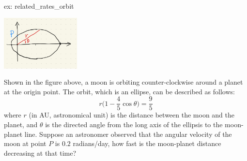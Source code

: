 \begin{ex}[]{ex: related_rates_orbit}
    \begin{center}
        \includegraphics[width = 0.3\textwidth]{figures/chap 05/rel_rates_orbit.png}
        \label{fig: rel_rates_orbit}    
    \end{center}
    Shown in the figure above, a moon is orbiting counter-clockwise around a planet at the origin point.  The orbit, which is an ellipse, can be described as follows:
    \[r\Big(1-\frac{4}{5}\cos \theta \Big) = \frac{9}{5}\]
    where $r$ (in AU, astronomical unit) is the distance between the moon and the planet, and $\theta$ is the directed angle from the long axis of the ellipsis to the moon-planet line.  Suppose an astronomer observed that the angular velocity of the moon at point $P$ is $0.2$ radians/day, how fast is the moon-planet distance decreasing at that time?
\end{ex}

